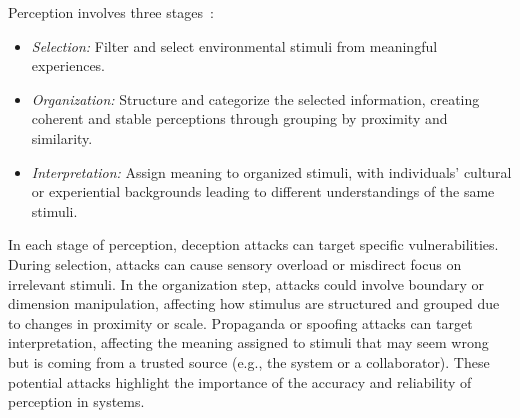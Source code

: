 Perception involves three stages~\cite{qiong2017brief}:
\begin{itemize}
\itemsep0em 
    \item \emph{Selection:} Filter and select environmental stimuli from meaningful experiences.
    \item \emph{Organization:} Structure and categorize the selected information, creating coherent and stable perceptions through grouping by proximity and similarity.
    \item \emph{Interpretation:} Assign meaning to organized stimuli, with individuals' cultural or experiential backgrounds leading to different understandings of the same stimuli.
\end{itemize}

In each stage of perception, \MR deception attacks can target specific vulnerabilities. 
During selection, attacks can cause sensory overload or misdirect focus on irrelevant stimuli. In the organization step, attacks could involve boundary or dimension manipulation, affecting how stimulus are structured and grouped due to changes in proximity or scale. Propaganda or spoofing attacks can target interpretation, affecting the meaning assigned to stimuli that may seem wrong but is coming from a trusted source (e.g., the system or a collaborator). These potential attacks highlight the importance of the accuracy and reliability of perception in \MR systems.

